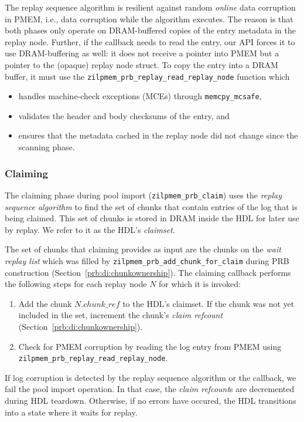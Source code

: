 \documentclass[12pt,a4paper,twoside]{book}
\begin{document}
The replay sequence algorithm is resilient against random \textit{online} data corruption in PMEM, i.e., data corruption while the algorithm executes.
The reason is that both phases only operate on DRAM-buffered copies of the entry metadata in the replay node.
Further, if the callback needs to read the entry, our API forces it to use DRAM-buffering as well:
it does not receive a pointer into PMEM but a pointer to the (opaque) replay node struct.
To copy the entry into a DRAM buffer, it must use the \lstinline{zilpmem_prb_replay_read_replay_node} function which
\begin{itemize}[noitemsep]
    \item handles machine-check exceptions (MCEs) through \lstinline{memcpy_mcsafe},
    \item validates the header and body checksums of the entry, and
    \item ensures that the metadata cached in the replay node did not change since the scanning phase.
\end{itemize}


\subsubsection{Claiming}
The claiming phase during pool import (\lstinline{zilpmem_prb_claim}) uses the \textit{replay sequence algorithm} to find the set of chunks that contain entries of the log that is being claimed.
This set of chunks is stored in DRAM inside the HDL for later use by replay.
We refer to it as the HDL's \textit{claimset}.

The set of chunks that claiming provides as input are the chunks on the \textit{wait replay list} which was filled by \lstinline{zilpmem_prb_add_chunk_for_claim} during PRB construction (Section~\ref{prb:di:chunkownership}).
The claiming callback performs the following steps for each replay node $N$ for which it is invoked:
\begin{enumerate}[noitemsep]
    \item Add the chunk $N.chunk\_ref$ to the HDL's claimset.
        If the chunk was not yet included in the set, increment the chunk's \textit{claim refcount} (Section~\ref{prb:di:chunkownership}).
    \item Check for PMEM corruption by reading the log entry from PMEM using \lstinline{zilpmem_prb_replay_read_replay_node}.
\end{enumerate}
If log corruption is detected by the replay sequence algorithm or the callback, we fail the pool import operation.
In that case, the \textit{claim refcount}s are decremented during HDL teardown.
Otherwise, if no errors have occured, the HDL transitions into a state where it waits for replay.
\end{document}
